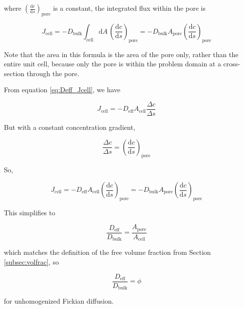 where $\left(\frac{\mathrm{d}c}{\mathrm{d}s}\right)_{\mathrm{pore}}$ is a constant,
the integrated flux within the pore is

\begin{equation}
J_\mathrm{cell} = -D_\mathrm{bulk} \int_\mathrm{cell} \mathrm{d}A\, \left(\frac{\mathrm{d}c}{\mathrm{d}s}\right)_{\mathrm{pore}}
 = -D_\mathrm{bulk} A_\mathrm{pore} \left(\frac{\mathrm{d}c}{\mathrm{d}s}\right)_{\mathrm{pore}}
\end{equation}

Note that the area in this formula is the area of the pore only,
rather than the entire unit cell, because only the pore is within the problem domain
at a cross-section through the pore.

From equation \ref{eq:Deff_Jcell}, we have

\begin{equation}
J_{\mathrm{cell}} = - D_{\mathrm{eff}} A_{\mathrm{cell}} \frac{\Delta c}{\Delta s}
\end{equation}

But with a constant concentration gradient,

\begin{equation}
\frac{\Delta c}{\Delta s} = \left(\frac{\mathrm{d}c}{\mathrm{d}s}\right)_{\mathrm{pore}}
\end{equation}

So,

\begin{equation}
J_{\mathrm{cell}} = - D_{\mathrm{eff}} A_{\mathrm{cell}} \left(\frac{\mathrm{d}c}{\mathrm{d}s}\right)_{\mathrm{pore}}
 = -D_\mathrm{bulk} A_\mathrm{pore} \left(\frac{\mathrm{d}c}{\mathrm{d}s}\right)_{\mathrm{pore}}
\end{equation}

This simplifies to

\begin{equation}
\frac{D_\mathrm{eff}}{D_\mathrm{bulk}} = \frac{A_\mathrm{pore}}{A_\mathrm{cell}}
\end{equation}

which matches the definition of the free volume fraction from Section \ref{subsec:volfrac}, so

\begin{equation}
\frac{D_\mathrm{eff}}{D_\mathrm{bulk}} = \phi
\end{equation}

for unhomogenized Fickian diffusion.

